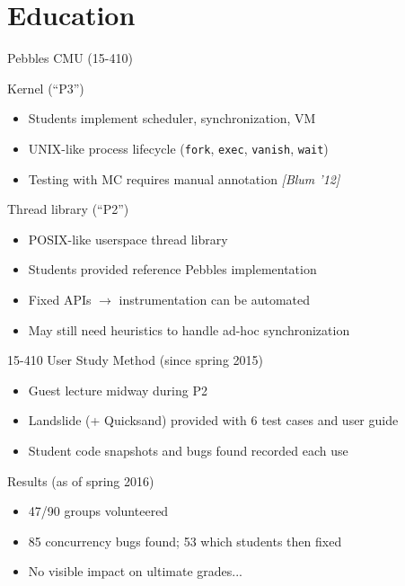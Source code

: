 \documentclass[xcolor=dvipsnames]{beamer}
\begin{document}

\section{Education}


\begin{frame}{Pebbles}
	CMU (15-410)
	\linegap

	Kernel (``P3'')
	\begin{itemize}
		\item Students implement scheduler, synchronization, VM %
		\item UNIX-like process lifecycle ({\tt fork}, {\tt exec}, {\tt vanish}, {\tt wait})
		\item Testing with MC requires manual annotation {\em [Blum '12]}
	\end{itemize}
	\pause
	\linegap

	Thread library (``P2'')
	\begin{itemize}
		\item POSIX-like userspace thread library %
		\item Students provided reference Pebbles implementation
		\item Fixed APIs $\rightarrow$ instrumentation can be automated
		\item May still need heuristics to handle ad-hoc synchronization
	\end{itemize}
\end{frame}

\begin{frame}{15-410 User Study}
	Method (since spring 2015)
	\begin{itemize}
		\item Guest lecture midway during P2
		\item Landslide (+ Quicksand) provided with 6 test cases and user guide
		\item Student code snapshots and bugs found recorded each use
	\end{itemize}
	\pause
	\linegap

	Results (as of spring 2016)
	\begin{itemize}
		\item 47/90 groups volunteered
		\item 85 concurrency bugs found; 53 which students then fixed
		\item No visible impact on ultimate grades...
	\end{itemize}
\end{frame}
\end{document}
